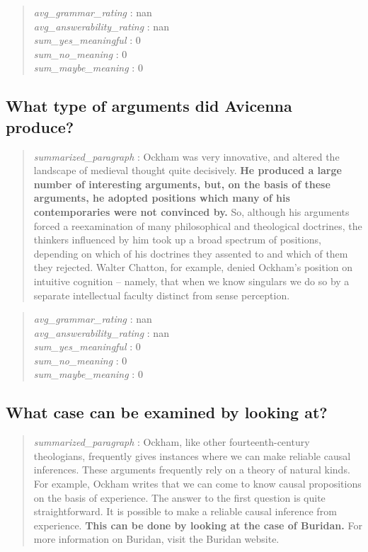 \begin{quote}
\emph{avg\_grammar\_rating} : nan\\
\emph{avg\_answerability\_rating} : nan\\
\emph{sum\_yes\_meaningful} : 0\\
\emph{sum\_no\_meaning} : 0\\
\emph{sum\_maybe\_meaning} : 0
\end{quote}

\hypertarget{what-type-of-arguments-did-avicenna-produce}{%
\subsection{What type of arguments did Avicenna
produce?}\label{what-type-of-arguments-did-avicenna-produce}}

\begin{quote}
\emph{summarized\_paragraph} : Ockham was very innovative, and altered
the landscape of medieval thought quite decisively. \textbf{He produced
a large number of interesting arguments, but, on the basis of these
arguments, he adopted positions which many of his contemporaries were
not convinced by.} So, although his arguments forced a reexamination of
many philosophical and theological doctrines, the thinkers influenced by
him took up a broad spectrum of positions, depending on which of his
doctrines they assented to and which of them they rejected. Walter
Chatton, for example, denied Ockham's position on intuitive cognition --
namely, that when we know singulars we do so by a separate intellectual
faculty distinct from sense perception.
\end{quote}

\begin{quote}
\emph{avg\_grammar\_rating} : nan\\
\emph{avg\_answerability\_rating} : nan\\
\emph{sum\_yes\_meaningful} : 0\\
\emph{sum\_no\_meaning} : 0\\
\emph{sum\_maybe\_meaning} : 0
\end{quote}

\hypertarget{what-case-can-be-examined-by-looking-at}{%
\subsection{What case can be examined by looking
at?}\label{what-case-can-be-examined-by-looking-at}}

\begin{quote}
\emph{summarized\_paragraph} : Ockham, like other fourteenth-century
theologians, frequently gives instances where we can make reliable
causal inferences. These arguments frequently rely on a theory of
natural kinds. For example, Ockham writes that we can come to know
causal propositions on the basis of experience. The answer to the first
question is quite straightforward. It is possible to make a reliable
causal inference from experience. \textbf{This can be done by looking at
the case of Buridan.} For more information on Buridan, visit the Buridan
website.
\end{quote}


